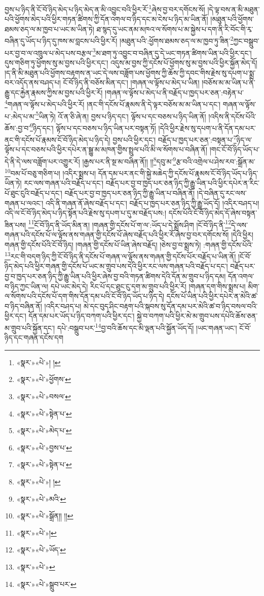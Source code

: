 བྱས་པ་ཉིད་ནི་ངོ་བོ་ཉིད་མེད་པ་ཉིད་མེད་ན་མི་འབྱུང་བའི་ཕྱིར་རོ་\footnote{«སྣར་»«པེ་»། །}ཞེས་བྱ་བར་དགོངས་སོ། །དེ་ལྟ་བས་ན་མི་མཐུན་པའི་ཕྱོགས་མེད་པའི་ཕྱིར་གཏན་ཚིགས་ཀྱི་དོན་འགལ་བ་ཉིད་དང་མ་ངེས་པ་ཉིད་མ་ཡིན་ནོ། །མཐུན་པའི་ཕྱོགས་ཐམས་ཅད་ལ་མ་ཁྱབ་པ་ཡང་མ་ཡིན་ཏེ། ཐ་སྙད་དུ་ཡང་ནམ་མཁའ་ལ་སོགས་པ་མ་སྐྱེས་པ་དག་ནི་རི་བོང་གི་རྭ་བཞིན་དུ་ཡོད་པ་ཉིད་དུ་ཁས་མ་བླངས་པའི་ཕྱིར་རོ། །མཐུན་པའི་:ཕྱོགས་ཐམས་ཅད་ལ་མ་ཁྱབ་ཏུ་ཟིན་\footnote{«སྣར་»«པེ་»ཕྱོགས་}ཀྱང་བསྒྲུབ་པར་བྱ་བ་ལ་འཁྲུལ་པ་མེད་པས་བརྩལ་\footnote{«སྣར་»«པེ་»བསལ་}མ་ཐག་ཏུ་འབྱུང་བ་བཞིན་དུ་དེ་ཡང་གཏན་ཚིགས་ཡིན་པའི་ཕྱིར་དང་། དུས་གཅིག་ཏུ་ཕྱོགས་སུ་མ་བྱས་པའི་ཕྱིར་དང་། འདུས་མ་བྱས་ཀྱི་དངོས་པོ་ཕྱོགས་སུ་མ་བྱས་པའི་ཕྱིར་སྐྱོན་མེད་དོ། །ད་ནི་མི་མཐུན་པའི་ཕྱོགས་བརྟགས་ན་ཡང་དེ་ལས་བཟློག་པས་ཕྱོགས་ཀྱི་ཆོས་ཀྱི་དབང་གིས་རྗེས་སུ་དཔག་པ་སྨྲ་བར་འདོད་ནས་བཤད་པ། ངོ་བོ་ཉིད་ནི་བཅོས་མིན་དང་། །གཞན་ལ་ལྟོས་པ་མེད་པ་ཡིན། །བཅོས་མ་མ་ཡིན་པ་ནི་རྒྱུ་དང་རྐྱེན་རྣམས་ཀྱིས་མ་བྱས་པའི་ཕྱིར་རོ། །གཞན་ལ་ལྟོས་པ་མེད་པ་ནི་བརྗོད་པ་ཁྱད་པར་ཅན་:བརྟེན་པ་\footnote{«སྣར་»«པེ་»སྟེན་པ་}གཞན་ལ་ལྟོས་པ་མེད་པའི་ཕྱིར་རོ། །ནང་གི་དངོས་པོ་རྣམས་ནི་དེ་ལྟར་བཅོས་མ་མ་ཡིན་པ་དང་། གཞན་ལ་ལྟོས་པ་:མེད་པ་མ་\footnote{«སྣར་»«པེ་»མེད་པ་}ཡིན་ཏེ། འོ་ན་ཅི་ཞེ་ན། བྱས་པ་ཉིད་དང་། ལྟོས་པ་དང་བཅས་པ་ཉིད་ཡིན་ནོ། །འདིས་ནི་དངོས་པོའི་ཆོས་:བྱ་བ་\footnote{«སྣར་»«པེ་»བྱས་པ་}ཉིད་དང་། ལྟོས་པ་དང་བཅས་པ་ཉིད་ཡིན་པར་བསྟན་ཏོ། །དེའི་ཕྱིར་རྗེས་སུ་དཔག་པ་ནི་དོན་དམ་པར་ནང་གི་དངོས་པོ་རྣམས་ངོ་བོ་ཉིད་མེད་པ་ཉིད་དེ། བྱས་པའི་ཕྱིར་དང་། བརྗོད་པ་ཁྱད་པར་ཅན་:བསྟན་པ་\footnote{«སྣར་»«པེ་»སྟེན་པ་}ཉིད་ལ་ལྟོས་པ་དང་བཅས་པའི་ཕྱིར་དཔེར་ན་སྒྱུ་མ་མཁན་གྱིས་སྤྲུལ་པའི་མི་ལ་སོགས་པ་བཞིན་ནོ། །གང་ངོ་བོ་ཉིད་ཡོད་པ་དེ་ནི་དེ་ལས་བཟློག་པར་འགྱུར་རོ། །རྒྱས་པར་ནི་སྔ་མ་བཞིན་ནོ།། །།\footnote{«སྣར་»«པེ་»། །}དབུ་མ་\footnote{«སྣར་»«པེ་»མའི་}རྩ་བའི་འགྲེལ་པ་ཤེས་རབ་:སྒྲོན་མ་\footnote{«སྣར་»«པེ་»སྒྲོན།། །།}བམ་པོ་བཅུ་གཅིག་པ། །འདིར་སྨྲས་པ། དོན་དམ་པར་ནང་གི་སྐྱེ་མཆེད་ཀྱི་དངོས་པོ་རྣམས་ངོ་བོ་ཉིད་ཡོད་པ་ཉིད་ཡིན་ཏེ། རང་ལས་གཞན་པའི་བརྗོད་པ་དང་། བརྗོད་པར་བྱ་བ་ཁྱད་པར་ཅན་ཉིད་ཀྱི་རྒྱུ་ཡིན་པའི་ཕྱིར་དཔེར་ན་རིང་པོ་ཐུང་ངུའི་བརྗོད་པ་དང་། བརྗོད་པར་བྱ་བ་ཁྱད་པར་ཅན་ཉིད་ཀྱི་རྒྱུ་ཡིན་པ་བཞིན་ནོ། །དེ་བཞིན་དུ་རང་ལས་གཞན་པ་ལའང་། འདི་ནི་གཞན་ནོ་ཞེས་བརྗོད་པ་དང་། བརྗོད་པ་ཁྱད་པར་ཅན་ཉིད་ཀྱི་རྒྱུ་ཡོད་དོ། །འདིར་བཤད་པ། འདི་ལ་ངོ་བོ་ཉིད་མེད་པ་ཉིད་སྟོན་པའི་རྗེས་སུ་དཔག་པ་དུ་མ་བརྗོད་པས:། དངོས་པོའི་ངོ་བོ་ཉིད་མེད་དོ་ཞེས་བསྟན་ཟིན་པས། \footnote{«སྣར་»«པེ་»།  }ངོ་བོ་ཉིད་ནི་ཡོད་མིན་ན། །གཞན་གྱི་དངོས་པོ་ག་ལ་:ཡོད་པ་དེ་སྨྲོས་ཤིག །ངོ་བོ་ཉིད་ནི་\footnote{«སྣར་»«པེ་»ཡོད་}དེ་ལས་གཞན་པའི་དངོས་པོ་ལ་ལྟོས་ནས་གཞན་གྱི་དངོས་པོ་ཞེས་བརྗོད་པའི་ཕྱིར་རོ་ཞེས་བྱ་བར་དགོངས་སོ། །དེའི་ཕྱིར། གཞན་གྱི་དངོས་པོའི་ངོ་བོ་ཉིད། །གཞན་གྱི་དངོས་པོ་ཡིན་ཞེས་བརྗོད། །ཅེས་བྱ་བ་སྨྲས་ཏེ། :གཞན་གྱི་དངོས་པོའི་\footnote{«སྣར་»«པེ་»}རང་གི་བདག་ཉིད་ཀྱི་ངོ་བོ་ཉིད་ནི་དངོས་པོ་གཞན་ལ་ལྟོས་ནས་གཞན་གྱི་དངོས་པོར་བརྗོད་པ་ཡིན་ནོ། །ངོ་བོ་ཉིད་མེད་པའི་ཕྱིར་གཞན་གྱི་དངོས་པོ་ཡང་མ་གྲུབ་པས་དེའི་ཕྱིར་རང་ལས་གཞན་པའི་བརྗོད་པ་དང་། བརྗོད་པར་བྱ་བ་ཁྱད་པར་ཅན་ཉིད་ཀྱི་རྒྱུ་ཡིན་པའི་ཕྱིར་ཞེས་བྱ་བའི་གཏན་ཚིགས་དེའི་དོན་མ་གྲུབ་པ་ཉིད་དམ། དོན་འགལ་བ་ཉིད་ཀྱང་ཡིན་ལ། དཔེ་ཡང་མེད་དེ། རིང་པོ་དང་ཐུང་ངུ་དག་མ་གྲུབ་པའི་ཕྱིར་རོ། །གཞན་དག་གིས་སྨྲས་པ། མིག་ལ་སོགས་པའི་དངོས་པོ་དག་གིས་དོན་དམ་པའི་ངོ་བོ་ཉིད་ཡོད་པ་ཉིད་དེ། དངོས་པོ་ཡིན་པའི་ཕྱིར་དཔེར་ན་མེའི་ཚ་བ་ཉིད་བཞིན་ནོ། །འདིར་བཤད་པ། མེ་དང་བུད་ཤིང་བརྟག་པའི་སྐབས་སུ་དོན་དམ་པར་མེའི་ཚ་བ་ཉིད་བསལ་བའི་ཕྱིར་དང་། དོན་དམ་པར་ཡོད་པ་ཉིད་བཀག་པའི་ཕྱིར་དང་། སྐྱེ་བ་བཀག་པའི་ཕྱིར་མེ་མ་གྲུབ་པས་དཔེའི་ཆོས་ཅན་མ་གྲུབ་པའི་སྐྱོན་དང་། དཔེ་:བསྒྲུབ་པར་\footnote{«སྣར་»«པེ་»སྒྲུབ་པར་}བྱ་བའི་ཆོས་དང་མི་ལྡན་པའི་སྐྱོན་ཡོད་དོ། །ཡང་གཞན་ཡང་། ངོ་བོ་ཉིད་དང་གཞན་དངོས་དག 